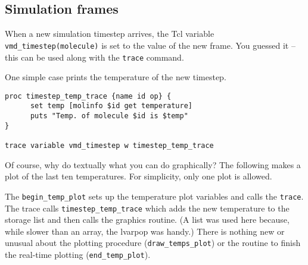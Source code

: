 \subsection{Simulation frames}
When a new simulation timestep arrives, the Tcl variable {\tt
vmd\_timestep(molecule)} is set to the value of the new frame.  You
guessed it -- this can be used along with the {\tt trace} command.

One simple case prints the temperature of the new timestep.

\begin{verbatim}
proc timestep_temp_trace {name id op} {
      set temp [molinfo $id get temperature]
      puts "Temp. of molecule $id is $temp"
}

trace variable vmd_timestep w timestep_temp_trace

\end{verbatim}

Of course, why do textually what you can do graphically?  The
following makes a plot of the last ten temperatures.  For simplicity,
only one plot is allowed.

The {\tt begin\_temp\_plot} sets up the temperature plot variables and
calls the {\tt trace}.  The trace calls {\tt timestep\_temp\_trace}
which adds the new temperature to the storage list and then calls the
graphics routine.  (A list was used here because, while slower than an
array, the lvarpop was handy.)  There is nothing new or unusual about
the plotting procedure ({\tt draw\_temps\_plot}) or the routine to
finish the real-time plotting ({\tt end\_temp\_plot}).

